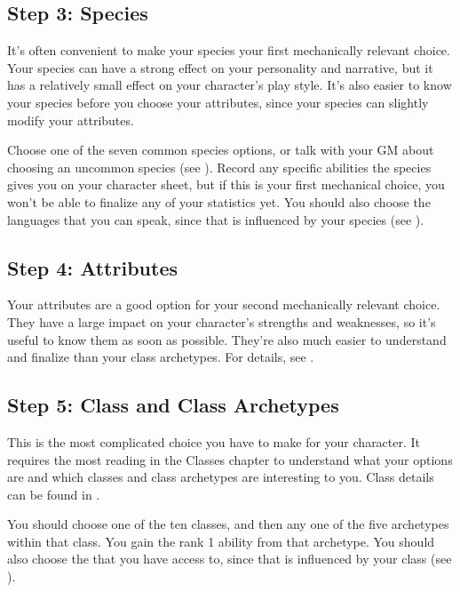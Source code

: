     \subsection{Step 3: Species}
        It's often convenient to make your species your first mechanically relevant choice.
        Your species can have a strong effect on your personality and narrative, but it has a relatively small effect on your character's play style.
        It's also easier to know your species before you choose your attributes, since your species can slightly modify your attributes.

        Choose one of the seven common species options, or talk with your GM about choosing an uncommon species (see ).
        Record any specific abilities the species gives you on your character sheet, but if this is your first mechanical choice, you won't be able to finalize any of your statistics yet.
        You should also choose the languages that you can speak, since that is influenced by your species (see ).

    \subsection{Step 4: Attributes}
        Your attributes are a good option for your second mechanically relevant choice.
        They have a large impact on your character's strengths and weaknesses, so it's useful to know them as soon as possible.
        They're also much easier to understand and finalize than your class archetypes.
        For details, see .

    \subsection{Step 5: Class and Class Archetypes}
        This is the most complicated choice you have to make for your character.
        It requires the most reading in the Classes chapter to understand what your options are and which classes and class archetypes are interesting to you.
        Class details can be found in .

        You should choose one of the ten classes, and then any one of the five archetypes within that class.
        You gain the rank 1 ability from that archetype.
        You should also choose the  that you have access to, since that is influenced by your class (see ).

